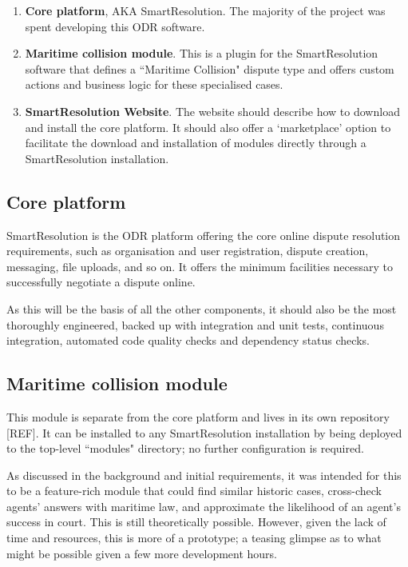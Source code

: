 \begin{enumerate}
    \item \textbf{Core platform}, AKA SmartResolution. The majority of the project was spent developing this ODR software.
    
    \item \textbf{Maritime collision module}. This is a plugin for the SmartResolution software that defines a ``Maritime Collision" dispute type and offers custom actions and business logic for these specialised cases.
    
    \item \textbf{SmartResolution Website}. The website should describe how to download and install the core platform. It should also offer a `marketplace' option to facilitate the download and installation of modules directly through a SmartResolution installation.
\end{enumerate}

\subsection{Core platform}

SmartResolution is the ODR platform offering the core online dispute resolution requirements, such as organisation and user registration, dispute creation, messaging, file uploads, and so on. It offers the minimum facilities necessary to successfully negotiate a dispute online.

As this will be the basis of all the other components, it should also be the most thoroughly engineered, backed up with integration and unit tests, continuous integration, automated code quality checks and dependency status checks.

\subsection{Maritime collision module}

This module is separate from the core platform and lives in its own repository [REF]. It can be installed to any SmartResolution installation by being deployed to the top-level ``modules" directory; no further configuration is required.

As discussed in the background and initial requirements, it was intended for this to be a feature-rich module that could find similar historic cases, cross-check agents' answers with maritime law, and approximate the likelihood of an agent's success in court. This is still theoretically possible. However, given the lack of time and resources, this is more of a prototype; a teasing glimpse as to what might be possible given a few more development hours.

